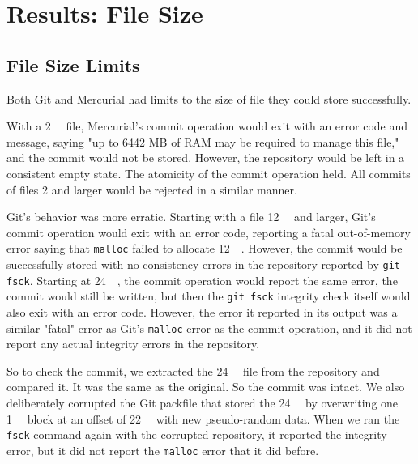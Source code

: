 \cleardoublepage

\section{Results: File Size}
\label{file-size-results}

\subsection{File Size Limits}
\label{file-size-limits-results}

Both Git and Mercurial had limits to the size of file they could store
successfully.

With a \SI{2}{\gibi\byte} file, Mercurial's \gls{commit} operation would exit
with an error code and message, saying "up to 6442 MB of RAM may be required to
manage this file," and the \gls{commit} would not be stored. However, the
\gls{repository} would be left in a consistent empty state. The atomicity of the
\gls{commit} operation held. All commits of files \SI{2}{\gib} and larger would
be rejected in a similar manner.

Git's behavior was more erratic. Starting with a file \SI{12}{\gibi\byte} and
larger, Git's \gls{commit} operation would exit with an error code, reporting a
fatal out-of-memory error saying that
\lstinline{malloc}
failed to allocate \SI{12}{\gibi\byte}.
However, the \gls{commit} would be successfully stored with no consistency
errors in the \gls{repository} reported by
\lstinline{git fsck}.
Starting at \SI{24}{\gibi\byte}, the \gls{commit} operation would report the
same error, the \gls{commit} would still be written, but then the
\lstinline{git fsck}
integrity check itself would also exit with an error code.
However, the error it reported in its output was a similar "fatal" error as
Git's
\lstinline{malloc}
error as the \gls{commit} operation, and it did not report any actual integrity
errors in the \gls{repository}.

So to check the \gls{commit}, we extracted the \SI{24}{\gibi\byte} file from the
\gls{repository} and compared it. It was the same as the original. So the
\gls{commit} was intact. We also deliberately corrupted the Git \gls{packfile}
that stored the \SI{24}{\gibi\byte} by overwriting one \SI{1}{\mebi\byte} block
at an offset of \SI{22}{\gibi\byte} with new pseudo-random data. When we ran the
\lstinline{fsck} command again with the corrupted \gls{repository}, it reported the
integrity error, but it did not report the \lstinline{malloc} error that it did
before.

